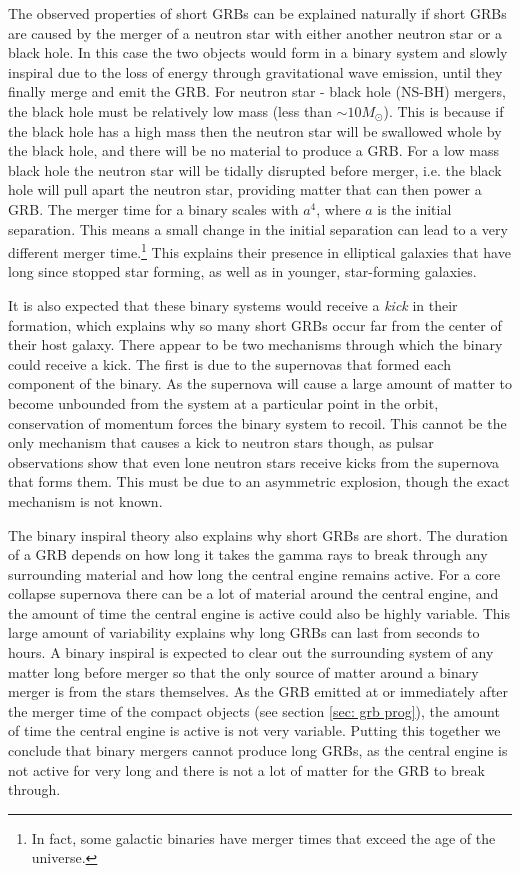 \documentclass[11pt]{cuthesis}
\begin{document}
The observed properties of short GRBs can be explained naturally if short GRBs are caused by the merger of a neutron star with either another neutron star or a black hole. In this case the two objects would form in a binary system and slowly inspiral due to the loss of energy through gravitational wave emission, until they finally merge and emit the GRB. For neutron star - black hole (NS-BH) mergers, the black hole must be relatively low mass (less than $\sim 10M_\odot$)\cite{gw_grb_paradigm}. This is because if the black hole has a high mass then the neutron star will be swallowed whole by the black hole, and there will be no material to produce a GRB. For a low mass black hole the neutron star will be tidally disrupted before merger, i.e. the black hole will pull apart the neutron star, providing matter that can then power a GRB. The merger time for a binary scales with $a^4$, where $a$ is the initial separation. This means a small change in the initial separation can lead to a very different merger time.\footnote{In fact, some galactic binaries have merger times that exceed the age of the universe.} This explains their presence in elliptical galaxies that have long since stopped star forming, as well as in younger, star-forming galaxies. 

It is also expected that these binary systems would receive a \textit{kick} in their formation, which explains why so many short GRBs occur far from the center of their host galaxy. There appear to be two mechanisms through which the binary could receive a kick. The first is due to the supernovas that formed each component of the binary. As the supernova will cause a large amount of matter to become unbounded from the system at a particular point in the orbit, conservation of momentum forces the binary system to recoil. This cannot be the only mechanism that causes a kick to neutron stars though, as pulsar observations show that even lone neutron stars receive kicks from the supernova that forms them. This must be due to an asymmetric explosion, though the exact mechanism is not known. 

The binary inspiral theory also explains why short GRBs are short. The duration of a GRB depends on how long it takes the gamma rays to break through any surrounding material and how long the central engine remains active. For a core collapse supernova there can be a lot of material around the central engine, and the amount of time the central engine is active could also be highly variable. This large amount of variability explains why long GRBs can last from seconds to hours. A binary inspiral is expected to clear out the surrounding system of any matter long before merger so that the only source of matter around a binary merger is from the stars themselves. As the GRB emitted at or immediately after the merger time of the compact objects (see section \ref{sec: grb prog}), the amount of time the central engine is active is not very variable. Putting this together we conclude that binary mergers cannot produce long GRBs, as the central engine is not active for very long and there is not a lot of matter for the GRB to break through.
\end{document}

